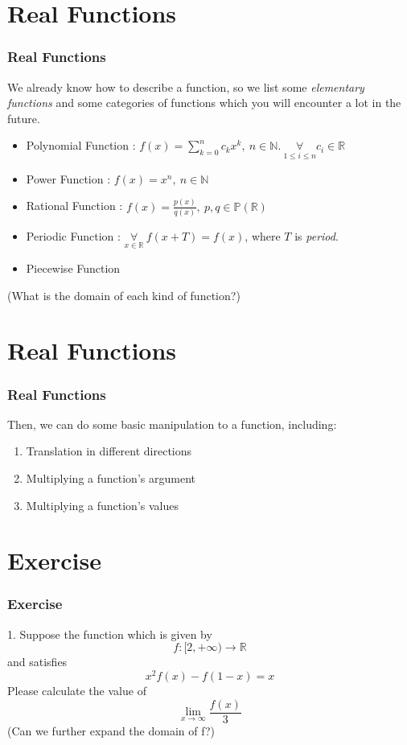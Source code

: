 \documentclass[12pt, t]{beamer}
\renewcommand{\emph}[1]{{\color{Turquoise3}\textsl{#1}}}
\begin{document}
\section{Real Functions}
\begin{frame}
    \frametitle{Real Functions}
    We already know how to describe a function, so we list some \emph{elementary functions} and some categories of functions
    which you will encounter a lot in the future.
    \begin{itemize}
        \item Polynomial Function : $f(x)=\sum^n_{k=0}c_kx^k,\ n\in \mathbb{N}.\ \underset{1\leq i\leq n}{\forall}c_i\in \mathbb{R}$
        \item Power Function : $f(x)=x^n,\ n\in \mathbb{N}$
        \item Rational Function : $f(x)=\frac{p(x)}{q(x)},\ p,q\in \mathbb{P}(\mathbb{R})$
        \item Periodic Function : $\underset{x\in \mathbb{R}}{\forall}\ f(x+T)=f(x)$, where $T$ is \emph{period}.
        \item Piecewise Function
    \end{itemize}
    (What is the domain of each kind of function?)
\end{frame}

\section{Real Functions}
\begin{frame}
    \frametitle{Real Functions}
    Then, we can do some basic manipulation to a function, including:
    \begin{enumerate}
        \item Translation in different directions
        \item Multiplying a function's argument
        \item Multiplying a function's values
    \end{enumerate}
\end{frame}

\section{Exercise}
\begin{frame}
    \frametitle{Exercise}
    1. Suppose the function which is given by
    \begin{equation*}
        f:[2,+\infty)\rightarrow \mathbb{R}
    \end{equation*}
    and satisfies
    \begin{equation*}
        x^2f(x)-f(1-x)=x
    \end{equation*}
    Please calculate the value of
    \begin{equation*}
        \lim_{x\rightarrow \infty}\frac{f(x)}{3}
    \end{equation*}
    (Can we further expand the domain of f?)
\end{frame}
\end{document}
